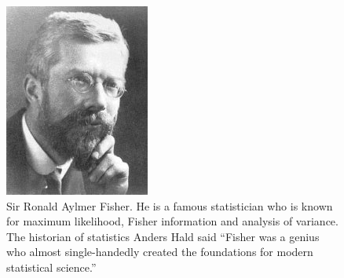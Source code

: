 \documentclass[12pt]{article}
\begin{document}
\begin{enumerate}
\begin{figure}[h]
\centering
\includegraphics{RonaldFisher.jpg}
\caption{Sir Ronald Aylmer Fisher. He is a famous statistician who is known for maximum likelihood, Fisher information and analysis of variance. The historian of statistics Anders Hald said ``Fisher was a genius who almost single-handedly created the foundations for modern statistical science.''}
\end{figure}
\end{enumerate}
\end{document}
